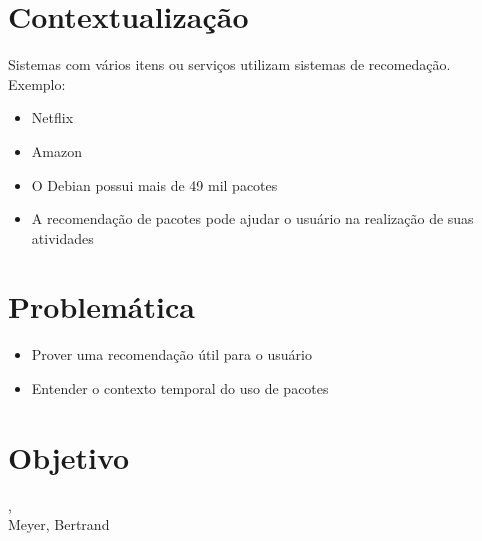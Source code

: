 \section{Contextualização} %
\label{sec:contextualizacao}

\begin{frame}
    Sistemas com vários itens ou serviços utilizam sistemas
de recomedação. Exemplo:
    \begin{itemize}
        \item Netflix
        \item Amazon
    \end{itemize}
\end{frame}

\begin{frame}
    \begin{itemize}
        \item O Debian possui mais de 49 mil pacotes
        \item A recomendação de pacotes pode ajudar o usuário
        na realização de suas atividades
    \end{itemize}
\end{frame}


\section{Problemática} %
\label{sec:problematica}

\begin{frame}
  \begin{itemize}
    \item Prover uma recomendação útil para o usuário
    \item Entender o contexto temporal do uso de pacotes
  \end{itemize}
\end{frame}


\section{Objetivo} %
\label{sec:objetivo}

\begin{frame}
	, \\Meyer, Bertrand
\end{frame}

